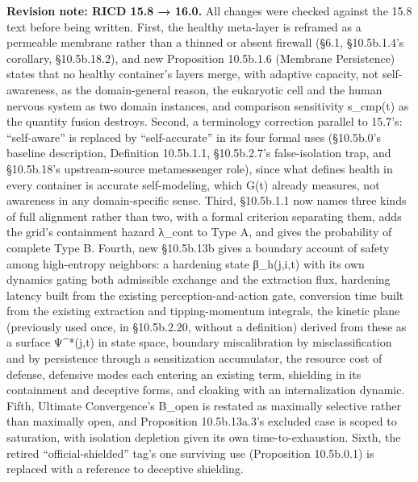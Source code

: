 \documentclass[
]{article}
\begin{document}
\textbf{Revision note: RICD 15.8 → 16.0.} All changes were checked
against the 15.8 text before being written. First, the healthy
meta-layer is reframed as a permeable membrane rather than a thinned or
absent firewall (§6.1, §10.5b.1.4's corollary, §10.5b.18.2), and new
Proposition 10.5b.1.6 (Membrane Persistence) states that no healthy
container's layers merge, with adaptive capacity, not self-awareness, as
the domain-general reason, the eukaryotic cell and the human nervous
system as two domain instances, and comparison sensitivity s\_cmp(t) as
the quantity fusion destroys. Second, a terminology correction parallel
to 15.7's: ``self-aware'' is replaced by ``self-accurate'' in its four
formal uses (§10.5b.0's baseline description, Definition 10.5b.1.1,
§10.5b.2.7's false-isolation trap, and §10.5b.18's upstream-source
metamessenger role), since what defines health in every container is
accurate self-modeling, which G(t) already measures, not awareness in
any domain-specific sense. Third, §10.5b.1.1 now names three kinds of
full alignment rather than two, with a formal criterion separating them,
adds the grid's containment hazard λ\_cont to Type A, and gives the
probability of complete Type B. Fourth, new §10.5b.13b gives a boundary
account of safety among high-entropy neighbors: a hardening state
β\_h(j,i,t) with its own dynamics gating both admissible exchange and the
extraction flux, hardening latency built from the existing
perception-and-action gate, conversion time built from the existing
extraction and tipping-momentum integrals, the kinetic plane (previously
used once, in §10.5b.2.20, without a definition) derived from these as
a surface Ψ\^{}*(j,t) in state space, boundary miscalibration by
misclassification and by persistence through a sensitization
accumulator, the resource cost of defense, defensive modes each entering
an existing term, shielding in its containment and deceptive forms, and
cloaking with an internalization dynamic. Fifth, Ultimate Convergence's
B\_open is restated as maximally selective rather than maximally open,
and Proposition 10.5b.13a.3's excluded case is scoped to saturation,
with isolation depletion given its own time-to-exhaustion. Sixth, the
retired ``official-shielded'' tag's one surviving use (Proposition
10.5b.0.1) is replaced with a reference to deceptive shielding.
\end{document}

